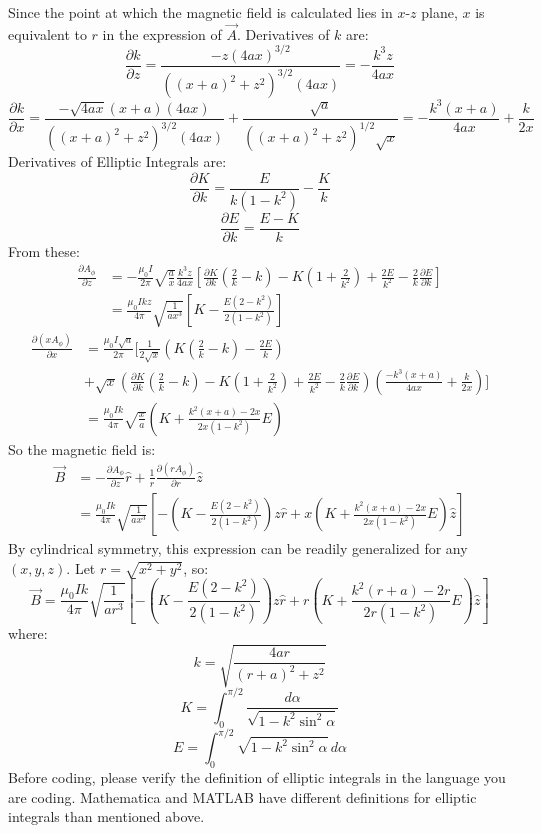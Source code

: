 \documentclass[12pt]{article}
\begin{document}
Since the point at which the magnetic field is calculated lies in $x$-$z$ plane, $x$ is equivalent to $r$ in the expression of $\vec{A}$. Derivatives of $k$ are:
$$ \frac{\partial k}{\partial z}=\frac{-z\left(4ax\right)^{3/2}}{\left(\left(x+a\right)^2+z^2\right)^{3/2}\left(4ax\right)}=-\frac{k^3z}{4ax} $$
$$ \frac{\partial k}{\partial x}=\frac{-\sqrt{4ax}\left(x+a\right)\left(4ax\right)}{\left(\left(x+a\right)^2+z^2\right)^{3/2}\left(4ax\right)}+\frac{\sqrt{a}}{\left(\left(x+a\right)^2+z^2\right)^{1/2}\sqrt{x}}=-\frac{k^3\left(x+a\right)}{4ax}+\frac{k}{2x} $$
Derivatives of Elliptic Integrals are:
$$ \frac{\partial K}{\partial k}=\frac{E}{k\left(1-k^2\right)}-\frac{K}{k} $$
$$ \frac{\partial E}{\partial k}=\frac{E-K}{k} $$
From these:
\begin{align}\frac{\partial A_\phi}{\partial z}&=-\frac{\mu_0I}{2\pi}\sqrt{\frac{a}{x}}\frac{k^3z}{4ax}\left[\frac{\partial K}{\partial k}\left(\frac{2}{k}-k\right)-K\left(1+\frac{2}{k^2}\right)+\frac{2E}{k^2}-\frac{2}{k}\frac{\partial E}{\partial k}\right] \nonumber \\ &=\frac{\mu_0Ikz}{4\pi}\sqrt{\frac{1}{ax^3}}\left[K-\frac{E(2-k^2)}{2(1-k^2)}\right] \nonumber \end{align}
\begin{align}\frac{\partial(xA_\phi)}{\partial x}&=\frac{\mu_0I\sqrt{a}}{2\pi}\Bigg[\frac{1}{2\sqrt{x}}\left(K\left(\frac{2}{k}-k\right)-\frac{2E}{k}\right) \nonumber \\ & +\sqrt{x}\left(\frac{\partial K}{\partial k}\left(\frac{2}{k}-k\right)-K\left(1+\frac{2}{k^2}\right)+\frac{2E}{k^2}-\frac{2}{k}\frac{\partial E}{\partial k}\right)\left(\frac{-k^3(x+a)}{4ax}+\frac{k}{2x}\right)\Bigg] \nonumber \\
&=\frac{\mu_0Ik}{4\pi}\sqrt{\frac{x}{a}}\left(K+\frac{k^2(x+a)-2x}{2x(1-k^2)}E\right) \nonumber \end{align}
So the magnetic field is:
\begin{align} \vec{B}&=-\frac{\partial A_\phi}{\partial z}\hat{r}+\frac{1}{r}\frac{\partial(rA_\phi)}{\partial r}\hat{z} \nonumber \\
& =\frac{\mu_0Ik}{4\pi}\sqrt{\frac{1}{ax^3}}\left[-\left( K-\frac{E(2-k^2)}{2(1-k^2)}\right)z\hat{r}+x\left(K+\frac{k^2(x+a)-2x}{2x(1-k^2)}E\right)\hat{z}\right] \nonumber \end{align}
By cylindrical symmetry, this expression can be readily generalized for any $(x,y,z)$. Let $r=\sqrt{x^2+y^2}$, so:
$$ \vec{B}=\frac{\mu_0Ik}{4\pi}\sqrt{\frac{1}{ar^3}}\left[-\left( K-\frac{E(2-k^2)}{2(1-k^2)}\right)z\hat{r}+r\left(K+\frac{k^2(r+a)-2r}{2r(1-k^2)}E\right)\hat{z}\right] $$
where:
$$ k=\sqrt{\frac{4ar}{(r+a)^2+z^2}} $$
$$ K=\int_0^{\pi/2}\frac{d\alpha}{\sqrt{1-k^2\sin^2\alpha}} $$
$$ E=\int_0^{\pi/2}\sqrt{1-k^2\sin^2\alpha}\,d\alpha $$
Before coding, please verify the definition of elliptic integrals in the language you are coding. Mathematica and MATLAB have different definitions for elliptic integrals than mentioned above. \\
\end{document}
